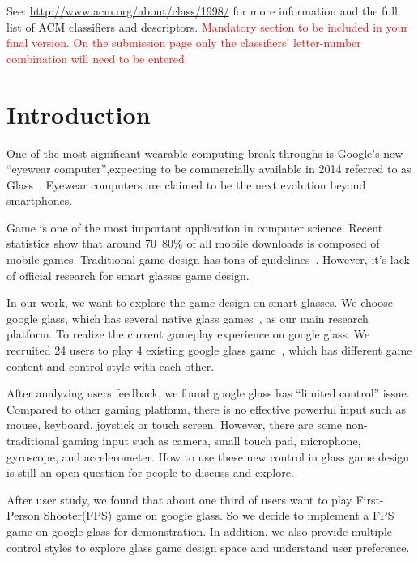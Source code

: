 \documentclass{sigchi}
\begin{document}


See: \url{http://www.acm.org/about/class/1998/}
for more information and the full list of ACM classifiers
and descriptors. 
\textcolor{red}{Mandatory section to be included in your
final version. On the submission page only the classifiers'
letter-number combination will need to be entered.}

\section{Introduction}
One of the most significant wearable computing break-throughs is Google's new ``eyewear computer'',expecting to be commercially available in 2014 referred to as Glass~\cite{glass}.
Eyewear computers are claimed to be the next evolution beyond smartphones. 

Game is one of the most important application in computer science. Recent statistics show that around 70~80\% of all mobile downloads is composed of mobile games\cite{statistics,infographic}. Traditional game design has tons of guidelines~\cite{videogame,mobilegame,bodygame,gameflow,argame,wearable}. However, it's lack of official research for smart glasses game design.

In our work, we want to explore the game design on smart glasses. We choose google glass, which has  several native glass games~\cite{minigame}, as our main research platform. To realize the current gameplay experience on google glass. We recruited 24 users to play 4 existing google glass game~\cite{minigame}, which has different game content and control style with each other. 

After analyzing users feedback, we found google glass has ``limited control'' issue. Compared to other gaming platform, there is no effective powerful input such as mouse, keyboard, joystick or touch screen. However, there are some non-traditional gaming input such as camera, small touch pad, microphone, gyroscope, and accelerometer. How to use these new control in glass game design is still an open question for people to discuss and explore. 

After user study, we found that about one third of users want to play First-Person Shooter(FPS) game on google glass. So we decide to implement a FPS game on google glass for demonstration. In addition, we also provide multiple control styles to explore glass game design space and understand user preference.
\end{document}
